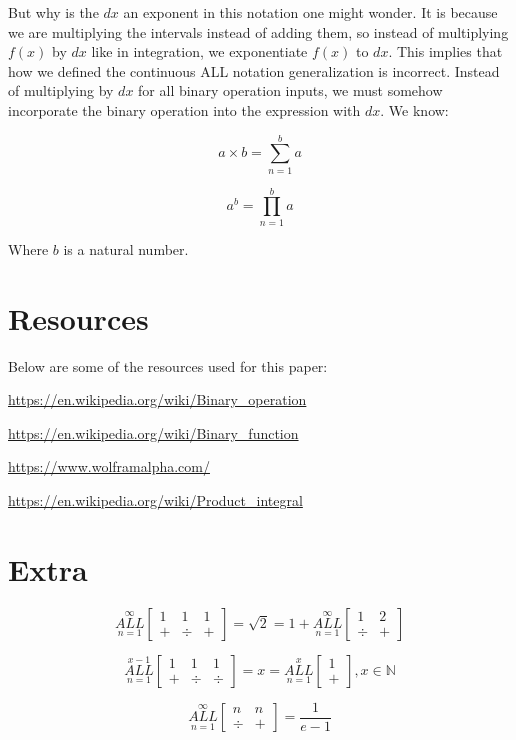 \documentclass{article}
\begin{document}
But why is the $dx$ an exponent in this notation one might wonder. It is because we are multiplying the intervals instead of adding them, so instead of multiplying $f(x)$ by $dx$ like in integration, we exponentiate $f(x)$ to $dx$. This implies that how we defined the continuous ALL notation generalization is incorrect. Instead of multiplying by $dx$ for all binary operation inputs, we must somehow incorporate the binary operation into the expression with $dx$. We know:

$$a \times b = \sum_{n=1}^b a$$

$$a^b = \prod_{n=1}^b a$$

Where $b$ is a natural number.

\section{Resources}


Below are some of the resources used for this paper:

\url{https://en.wikipedia.org/wiki/Binary_operation}

\url{https://en.wikipedia.org/wiki/Binary_function}

\url{https://www.wolframalpha.com/}

\url{https://en.wikipedia.org/wiki/Product_integral}

\section{Extra}

$$\underset{n=1}{\overset{\infty}{ALL}} \begin{bmatrix}
1 & 1 & 1 \\
+&\div&+
\end{bmatrix} = \sqrt{2} = 1+\underset{n=1}{\overset{\infty}{ALL}} \begin{bmatrix}
1 & 2 \\
\div & +
\end{bmatrix}$$

$$\underset{n=1}{\overset{x-1}{ALL}} \begin{bmatrix}
1 & 1 & 1 \\
+&\div&\div
\end{bmatrix}=x=\underset{n=1}{\overset{x}{ALL}} \begin{bmatrix}
1 \\
+
\end{bmatrix}, x\in \mathbb{N}$$

$$\underset{n=1}{\overset{\infty}{ALL}} \begin{bmatrix}
n & n \\
\div & +
\end{bmatrix}=\frac{1}{e-1}$$
\end{document}
